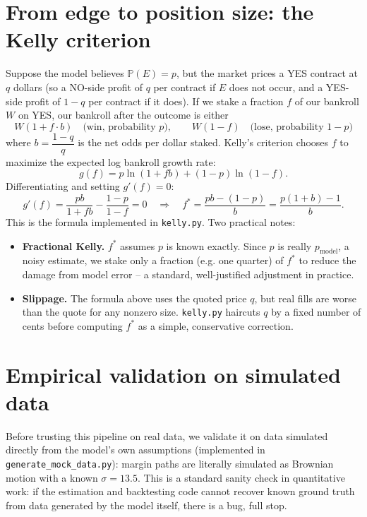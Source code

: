 \documentclass[11pt]{article}
\begin{document}
\section{From edge to position size: the Kelly criterion}

Suppose the model believes $\mathbb{P}(E) = p$, but the market prices a YES
contract at $q$ dollars (so a NO-side profit of $q$ per contract if $E$
does not occur, and a YES-side profit of $1-q$ per contract if it does).
If we stake a fraction $f$ of our bankroll $W$ on YES, our bankroll after
the outcome is either
\[
W(1 + f\cdot b) \quad \text{(win, probability } p), \qquad
W(1 - f) \quad \text{(lose, probability } 1-p)
\]
where $b = \dfrac{1-q}{q}$ is the net odds per dollar staked. Kelly's
criterion chooses $f$ to maximize the expected log bankroll growth rate:
\[
g(f) = p\ln(1+fb) + (1-p)\ln(1-f).
\]
Differentiating and setting $g'(f) = 0$:
\[
g'(f) = \frac{pb}{1+fb} - \frac{1-p}{1-f} = 0
\quad\Longrightarrow\quad
f^\ast = \frac{pb - (1-p)}{b} = \frac{p(1+b)-1}{b}.
\]
This is the formula implemented in \texttt{kelly.py}. Two practical notes:

\begin{itemize}
\item \textbf{Fractional Kelly.} $f^\ast$ assumes $p$ is known exactly.
Since $p$ is really $p_{\text{model}}$, a noisy estimate, we stake only a
fraction (e.g. one quarter) of $f^\ast$ to reduce the damage from model
error -- a standard, well-justified adjustment in practice.
\item \textbf{Slippage.} The formula above uses the quoted price $q$, but
real fills are worse than the quote for any nonzero size. \texttt{kelly.py}
haircuts $q$ by a fixed number of cents before computing $f^\ast$ as a
simple, conservative correction.
\end{itemize}

\section{Empirical validation on simulated data}

Before trusting this pipeline on real data, we validate it on data
simulated directly from the model's own assumptions (implemented in
\texttt{generate\_mock\_data.py}): margin paths are literally simulated as
Brownian motion with a known $\sigma = 13.5$. This is a standard sanity
check in quantitative work: if the estimation and backtesting code cannot
recover known ground truth from data generated by the model itself,
there is a bug, full stop.
\end{document}
